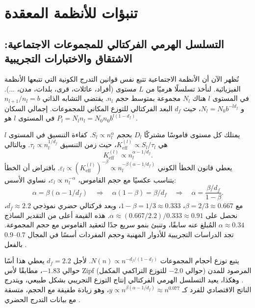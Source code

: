 \documentclass[11pt,a4paper]{article}
\theoremstyle{remark}
\newcommand{\Keff}{K_{\mathrm{eff}}}
\begin{document}
	\section{تنبؤات للأنظمة المعقدة}
	\label{sec:predictions}
	
	\subsection{التسلسل الهرمي الفركتالي للمجموعات الاجتماعية: الاشتقاق والاختبارات التجريبية}
	\label{sec:social_scaling}
	
	نُظهر الآن أن الأنظمة الاجتماعية تتبع نفس قوانين التدرج الكونية التي تتبعها الأنظمة الفيزيائية. لنأخذ تسلسلًا هرميًا من \(L\) مستوى (أفراد، عائلات، قرى، بلدات، مدن، ...). في المستوى \(l\) هناك \(N_l\) مجموعة بمتوسط حجم \(n_l\). يقتضي التشابه الذاتي \(n_{l+1}/n_l = b\) و \(N_l = N_0 b^{-l d_f}\)، حيث \(d_f\) البعد الفركتالي للتوزع المكاني للمجموعات. إجمالي السكان في المستوى \(l\) هو \(P_l = N_l n_l = N_0 n_0 b^{l(1-d_f)}\).
	
	يمتلك كل مستوى قاموسًا مشتركًا \(D_l\) بحجم \(S_l \propto n_l^{\alpha}\). كفاءة التنسيق في المستوى \(l\) هي \(\Keff^{(l)} \propto S_l / \tau_l\)، حيث زمن التنسيق \(\tau_l \propto n_l^{1/d_f}\). وبالتالي
	\begin{equation}
		\Keff^{(l)} \propto n_l^{\alpha - 1/d_f}. \tag{1}
	\end{equation}
	يعطي قانون الخطأ الكوني \(\varepsilon_l \propto (\Keff^{(l)})^{-\beta} \propto n_l^{-\beta(\alpha - 1/d_f)}\). بافتراض أن الخطأ يتناسب عكسيًا مع حجم القاموس، \(\varepsilon_l \propto n_l^{-\alpha}\)، نساوي الأسس:
	\begin{equation}
		\alpha = \beta(\alpha - 1/d_f) \quad\Longrightarrow\quad \alpha(1-\beta) = \beta / d_f \quad\Longrightarrow\quad \alpha = \frac{\beta / d_f}{1-\beta}.
	\end{equation}
	مع \(\beta = 2/3 \approx 0.667\)، \(1-\beta = 1/3 \approx 0.333\)، وبعد فركتالي حضري نموذجي \(d_f \approx 2.2\)، نحصل على \(\alpha \approx (0.667/2.2)/0.333 \approx 0.91\). هذه القيمة أعلى من التقدير الساذج \(\alpha \approx 0.34\) المُبلغ عنه سابقًا، وتنبئ بنمو سريع جدًا لتعقيد القاموس مع حجم المجموعة. تجد الدراسات التجريبية للأدوار المهنية وحجم المفردات أسسًا في المجال \(0.7\)–\(0.9\) بالفعل \cite{Bettencourt2007, Molinero2024}.
	
	يتبع توزع أحجام المجموعات \(N(n) \propto n^{-d_f/(1-d_f)}\). لأجل \(d_f = 2.2\) يعطي هذا أسًا حوالي \(-1.83\)، مطابقًا لأس Zipf المرصود للمدن (حوالي \(-2.0\) للتوزع التراكمي المكمل) \cite{Fluschnik2016, Rybski2023}. وهكذا، يعيد التسلسل الهرمي الفركتالي إنتاج التوزع التجريبي بشكل طبيعي، ويتدرج الناتج الاقتصادي للفرد كـ \(y \propto n^{\beta(\alpha - 1/d_f)} \approx n^{0.077}\)، وهو زيادة طفيفة مع الحجم، متسقة مع بيانات التدرج الحضري \cite{Bettencourt2007}.
	
\end{document}
